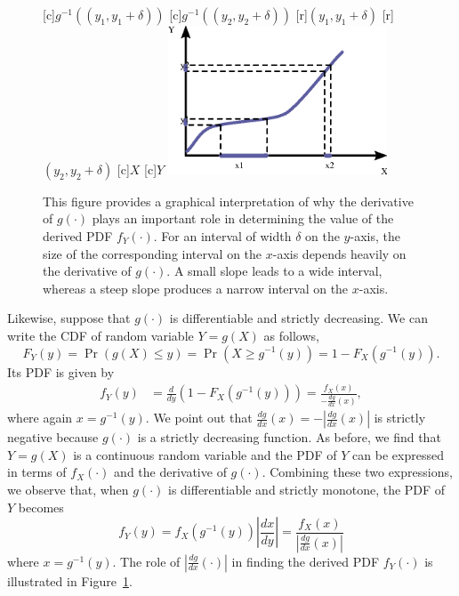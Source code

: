 \begin{figure}[ht]
\begin{center}
\begin{psfrags}
[c]{\footnotesize $g^{-1} ((y_1, y_1 + \delta))$}
[c]{\footnotesize $g^{-1} ((y_2, y_2 + \delta))$}
[r]{\footnotesize $(y_1, y_1 + \delta)$}
[r]{\footnotesize $(y_2, y_2 + \delta)$}
[c]{$X$}
[c]{$Y$}
\includegraphics[width=6.5cm]{Figures/9Chapter/Differentiable}
\end{psfrags}
\caption{This figure provides a graphical interpretation of why the derivative of $g(\cdot)$ plays an important role in determining the value of the derived PDF $f_Y(\cdot)$.
For an interval of width $\delta$ on the $y$-axis, the size of the corresponding interval on the $x$-axis depends heavily on the derivative of $g(\cdot)$.
A small slope leads to a wide interval, whereas a steep slope produces a narrow interval on the $x$-axis.}
\label{figure:DifferentiablePDF}
\end{center}
\end{figure}

Likewise, suppose that $g(\cdot)$ is differentiable and strictly decreasing.
We can write the CDF of random variable $Y = g(X)$ as follows,
\begin{equation*}
F_Y(y) = \Pr (g(X) \leq y)
= \Pr \left( X \geq g^{-1}(y) \right)
= 1 - F_X \left( g^{-1} (y) \right) .
\end{equation*}
Its PDF is given by
\begin{equation*}
\begin{split}
f_Y (y) &= \frac{d}{dy} \left( 1 - F_X \left( g^{-1} (y) \right) \right)
= \frac{f_X (x)}{- \frac{dg}{dx}(x)} ,
\end{split}
\end{equation*}
where again $x = g^{-1} (y)$.
We point out that $\frac{dg}{dx}(x) = - \left| \frac{dg}{dx}(x) \right|$ is strictly negative because $g(\cdot)$ is a strictly decreasing function.
As before, we find that $Y = g(X)$ is a continuous random variable and the PDF of $Y$ can be expressed in terms of $f_X( \cdot)$ and the derivative of $g(\cdot)$.
Combining these two expressions, we observe that, when $g(\cdot)$ is differentiable and strictly monotone, the PDF of $Y$ becomes
\begin{equation} \label{equation:MonotoneFunctionPDF}
f_Y (y) = f_X \left( g^{-1} (y) \right) \left| \frac{dx}{dy} \right|
= \frac{f_X (x)}{\left| \frac{dg}{dx}(x) \right|}
\end{equation}
where $x = g^{-1}(y)$.
The role of $\left| \frac{dg}{dx} (\cdot) \right|$ in finding the derived PDF $f_Y(\cdot)$ is illustrated in Figure~\ref{figure:DifferentiablePDF}.

